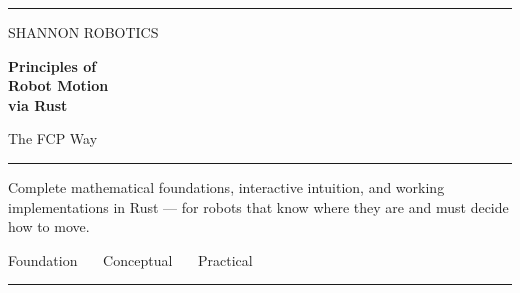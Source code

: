 \documentclass[11pt, twoside, openright]{book}
\begin{document}
\frontmatter
\pagestyle{empty}

\begin{titlepage}
\thispagestyle{empty}
\noindent
{\color{shTeal}\rule{\textwidth}{3pt}}
\vspace{2.2in}

\noindent
{\displayfont\fontsize{10}{12}\selectfont\color{shTealDark}%
 \MakeUppercase{Shannon Robotics}}

\vspace{10pt}
\noindent
{\displayfont\bfseries\fontsize{30}{35}\selectfont\color{shInk}%
 Principles of\\Robot Motion\\via Rust}

\vspace{12pt}
\noindent
{\displayfont\fontsize{16}{20}\selectfont\color{shInkMuted}%
 The FCP Way}

\vspace{20pt}
\noindent
{\color{shSlate300}\rule{2.4in}{0.6pt}}

\vspace{16pt}
\noindent
\begin{minipage}{4.2in}
{\fontsize{11}{15}\selectfont\color{shInkSecondary}%
 Complete mathematical foundations, interactive intuition, and working
 implementations in Rust --- for robots that know where they are and must
 decide how to move.}
\end{minipage}

\vfill
\noindent
{\displayfont\fontsize{9}{12}\selectfont\color{shInkMuted}%
 Foundation \ \textperiodcentered\ \ Conceptual \ \textperiodcentered\ \ Practical}

\vspace{6pt}
\noindent
{\color{shTeal}\rule{\textwidth}{3pt}}
\end{titlepage}
\end{document}
